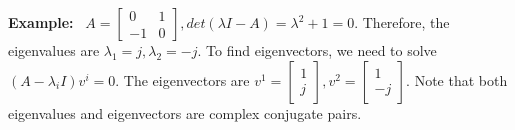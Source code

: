 \documentclass[letterpaper]{article}
\begin{document}
\noindent \textbf{Example:}~ $A=\left[\begin{array}{cc}
    0 & 1\\
    -1 & 0
    \end{array}\right], det(\lambda I-A)=\lambda^2+1=0$.
    \newline
    Therefore, the eigenvalues are $\lambda_{1}=j,\lambda_{2}=-j$.
    \newline
    To find eigenvectors, we need to solve $(A-\lambda_{i}I)v^{i}=0$.
    \newline
    The eigenvectors are $v^{1}=\left[\begin{array}{c}
        1\\
        j
    \end{array}\right],v^{2}=\left[\begin{array}{c}
        1\\
        -j
    \end{array}\right]$.
    \newline
    Note that both eigenvalues and eigenvectors are complex conjugate pairs.

\noindent
\end{document}
